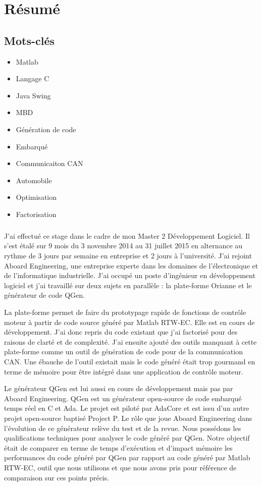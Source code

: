 \chapter*{Résumé}

\section*{Mots-clés}
\begin{itemize}
  \item Matlab
  \item Langage C
  \item Java Swing
  \item MBD
  \item Génération de code
  \item Embarqué
  \item Communicaiton CAN
  \item Automobile
  \item Optimisation
  \item Factorisation
\end{itemize}

\paragraph*{}
J'ai effectué ce stage dans le cadre de mon Master 2 Développement Logiciel. Il s'est étalé sur 9 mois du 3 novembre 2014 au 31 juillet 2015 en alternance au rythme de 3 jours par semaine en entreprise et 2 jours à l'université. J'ai rejoint Aboard Engineering, une entreprise experte dans les domaines de l'électronique et de l'informatique industrielle.
J'ai occupé un poste d'ingénieur en développement logiciel et j'ai travaillé sur deux sujets en parallèle : la plate-forme Orianne et le générateur de code QGen.

La plate-forme permet de faire du prototypage rapide de fonctions de contrôle moteur à partir de code source généré par Matlab\up{\circledR} RTW-EC\up{\circledR}.
Elle est en cours de développement. J'ai donc repris du code existant que j'ai factorisé pour des raisons de clarté et de complexité. J'ai ensuite ajouté des outils manquant à cette plate-forme comme un outil de génération de code pour de la communication CAN. Une ébauche de l'outil existait mais le code généré était trop gourmand en terme de mémoire pour être intégré dans une application de contrôle moteur.

Le générateur QGen est lui aussi en cours de développement mais pas par Aboard Engineering. QGen est un générateur open-source de code embarqué temps réel en C et Ada. Le projet est piloté par AdaCore et est issu d'un autre projet open-source baptisé Project P. Le rôle que joue Aboard Engineering dans l'évolution de ce générateur relève du test et de la revue. Nous possédons les qualifications techniques pour analyser le code généré par QGen. Notre objectif était de comparer en terme de temps d'exécution et d'impact mémoire les performances du code généré par QGen par rapport au code généré par Matlab\up{\circledR} RTW-EC\up{\circledR}, outil que nous utilisons et que nous avons pris pour référence de comparaison sur ces points précis.

